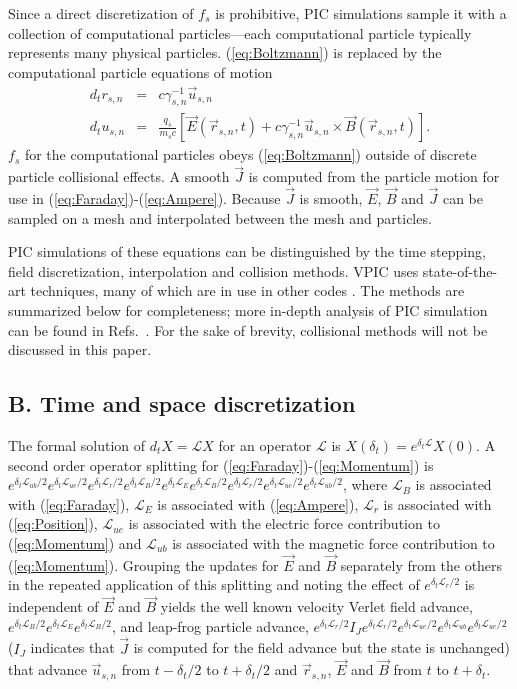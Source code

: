 \documentclass[letter,10pt]{article}
\newcommand{\vecr}{\vec{r}}
\newcommand{\vecu}{\vec{u}}
\newcommand{\vecJ}{\vec{J}}
\newcommand{\vecE}{\vec{E}}
\newcommand{\vecB}{\vec{B}}
\newcommand{\op}{\mathcal{L}}
\newcommand{\Deriv}[2]{d_{#2}#1}
\newcommand{\CrossP}[2]{#1 \times #2}
\newcommand{\eq}[1]{(\ref{eq:#1})}
\begin{document}
Since a direct discretization of $f_s$ is prohibitive, PIC simulations
sample it with a collection of computational particles---each
computational particle typically represents many physical particles.
\eq{Boltzmann} is replaced by the computational particle
equations of motion
\begin{eqnarray}
\Deriv{r_{s,n}}{t} &=& c \gamma_{s,n}^{-1} \vecu_{s,n} \label{eq:Position}\\
\Deriv{u_{s,n}}{t} &=& \frac{q_s}{m_s c} \left[
\vecE\left(\vecr_{s,n},t\right) +
\CrossP{c\gamma_{s,n}^{-1}\vecu_{s,n}}{\vecB\left(\vecr_{s,n},t\right)}
\right] \label{eq:Momentum}
.
\end{eqnarray}
$f_s$ for the computational particles obeys \eq{Boltzmann} outside of
discrete particle collisional effects.  A smooth $\vecJ$ is computed
from the particle motion for use in \eq{Faraday}-\eq{Ampere}.  Because
$\vecJ$ is smooth, $\vecE$, $\vecB$ and $\vecJ$ can be sampled on a
mesh and interpolated between the mesh and particles.

PIC simulations of these equations can be distinguished by the time
stepping, field discretization, interpolation and collision methods.
VPIC uses state-of-the-art techniques, many of which are in use in
other codes
\cite{Kwan_Snell_1985,Verboncoeur_et_al_1995,Eastwood_et_al_1995,Jones_et_al_1996,Blahovec_et_al_2000,Nieter_Cary_2004}.
The methods are summarized below for completeness; more in-depth
analysis of PIC simulation can be found in
Refs.~\cite{Birdsall_Langdon_1985,Hockney_Eastwood_1988}.  For the
sake of brevity, collisional methods will not be discussed in this
paper.

\subsection{B. Time and space discretization}

The formal solution of $\Deriv{X}{t} = \op X$ for an operator $\op$ is
$X\left(\delta_t\right) = e^{\delta_t\op} X\left(0\right)$.  A second
order operator splitting \cite{McLachlan_Quispel_2002} for
\eq{Faraday}-\eq{Momentum} is
$e^{\delta_t\op_{ub}/2} e^{\delta_t\op_{ue}/2} e^{\delta_t\op_r/2}
e^{\delta_t\op_B/2}e^{\delta_t\op_E} e^{\delta_t\op_B/2}
e^{\delta_t\op_r/2} e^{\delta_t\op_{ue}/2} e^{\delta_t\op_{ub}/2}$,
where $\op_B$ is associated with \eq{Faraday}, $\op_E$ is associated
with \eq{Ampere}, $\op_r$ is associated with \eq{Position}, $\op_{ue}$
is associated with the electric force contribution to \eq{Momentum}
and $\op_{ub}$ is associated with the magnetic force contribution to
\eq{Momentum}.  Grouping the updates for $\vecE$ and $\vecB$ separately
from the others in the repeated application of this splitting and
noting the effect of $e^{\delta_t\op_r/2}$ is independent of $\vecE$
and $\vecB$ yields the well known velocity Verlet field advance,
$e^{\delta_t\op_B/2} e^{\delta_t\op_E} e^{\delta_t\op_B/2}$, and
leap-frog particle advance, $e^{\delta_t\op_r/2} I_J
e^{\delta_t\op_r/2} e^{\delta_t\op_{ue}/2} e^{\delta_t\op_{ub}}
e^{\delta_t\op_{ue}/2}$ ($I_J$ indicates that $\vecJ$ is computed for
the field advance but the state is unchanged) that advance
$\vecu_{s,n}$ from $t-\delta_t/2$ to $t+\delta_t/2$ and $\vecr_{s,n}$,
$\vecE$ and $\vecB$ from $t$ to $t+\delta_t$.
\end{document}
